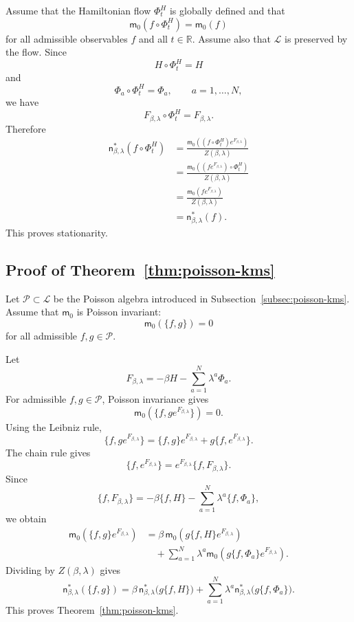 \documentclass[11pt,reqno]{amsart}
\begin{document}
Assume that the Hamiltonian flow $\Phi_t^H$ is globally defined and
that
\[
\mathsf m_0(f\circ\Phi_t^H)
=
\mathsf m_0(f)
\]
for all admissible observables $f$ and all $t\in\mathbb R$. Assume also
that $\mathcal L$ is preserved by the flow. Since
\[
H\circ\Phi_t^H=H
\]
and
\[
\Phi_a\circ\Phi_t^H=\Phi_a,
\qquad
a=1,\ldots,N,
\]
we have
\[
F_{\beta,\lambda}\circ\Phi_t^H
=
F_{\beta,\lambda}.
\]
Therefore
\begin{align*}
\mathsf n_{\beta,\lambda}^*
(f\circ\Phi_t^H)
&=
\frac{
\mathsf m_0\left(
(f\circ\Phi_t^H)e^{F_{\beta,\lambda}}
\right)
}{
Z(\beta,\lambda)
}
\\
&=
\frac{
\mathsf m_0\left(
(fe^{F_{\beta,\lambda}})\circ\Phi_t^H
\right)
}{
Z(\beta,\lambda)
}
\\
&=
\frac{
\mathsf m_0(fe^{F_{\beta,\lambda}})
}{
Z(\beta,\lambda)
}
\\
&=
\mathsf n_{\beta,\lambda}^*(f).
\end{align*}
This proves stationarity.

\subsection{Proof of Theorem~\ref{thm:poisson-kms}}

Let $\mathcal P\subset\mathcal L$ be the Poisson algebra introduced in
Subsection~\ref{subsec:poisson-kms}. Assume that $\mathsf m_0$ is
Poisson invariant:
\[
\mathsf m_0(\{f,g\})=0
\]
for all admissible $f,g\in\mathcal P$.

Let
\[
F_{\beta,\lambda}
=
-\beta H-\sum_{a=1}^{N}\lambda^a\Phi_a.
\]
For admissible $f,g\in\mathcal P$, Poisson invariance gives
\[
\mathsf m_0
\left(
\{f,ge^{F_{\beta,\lambda}}\}
\right)
=
0.
\]
Using the Leibniz rule,
\[
\{f,ge^{F_{\beta,\lambda}}\}
=
\{f,g\}e^{F_{\beta,\lambda}}
+
g\{f,e^{F_{\beta,\lambda}}\}.
\]
The chain rule gives
\[
\{f,e^{F_{\beta,\lambda}}\}
=
e^{F_{\beta,\lambda}}
\{f,F_{\beta,\lambda}\}.
\]
Since
\[
\{f,F_{\beta,\lambda}\}
=
-\beta\{f,H\}
-
\sum_{a=1}^{N}\lambda^a\{f,\Phi_a\},
\]
we obtain
\begin{align*}
\mathsf m_0
\left(
\{f,g\}e^{F_{\beta,\lambda}}
\right)
&=
\beta\,
\mathsf m_0
\left(
g\{f,H\}e^{F_{\beta,\lambda}}
\right)
\\
&\quad+
\sum_{a=1}^{N}\lambda^a
\mathsf m_0
\left(
g\{f,\Phi_a\}e^{F_{\beta,\lambda}}
\right).
\end{align*}
Dividing by $Z(\beta,\lambda)$ gives
\[
\mathsf n_{\beta,\lambda}^*(\{f,g\})
=
\beta\,
\mathsf n_{\beta,\lambda}^*
\bigl(g\{f,H\}\bigr)
+
\sum_{a=1}^{N}\lambda^a
\mathsf n_{\beta,\lambda}^*
\bigl(g\{f,\Phi_a\}\bigr).
\]
This proves Theorem~\ref{thm:poisson-kms}.
\end{document}
